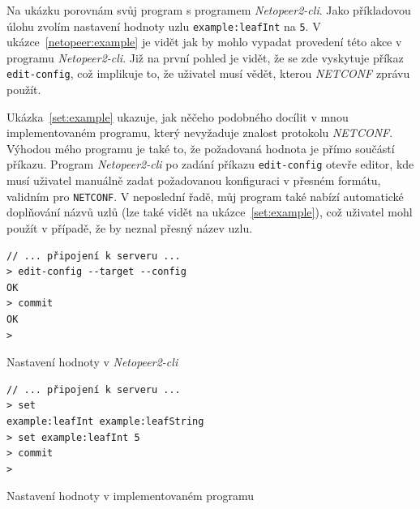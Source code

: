 \documentclass[thesis=B,czech,hidelinks]{FITthesis}[2019/03/06]
\begin{document}
Na ukázku porovnám svůj program s programem \textit{Netopeer2-cli}. Jako příkladovou úlohu zvolím nastavení hodnoty uzlu \texttt{example:leafInt} na \texttt{5}. V ukázce~\ref{netopeer:example} je vidět jak by mohlo vypadat provedení této akce v programu \textit{Netopeer2-cli}. Již na první pohled je vidět, že se zde vyskytuje příkaz \texttt{edit-config}, což implikuje to, že uživatel musí vědět, kterou \textit{NETCONF} zprávu použít.

Ukázka~\ref{set:example} ukazuje, jak něčeho podobného docílit v mnou implementovaném programu, který nevyžaduje znalost protokolu \textit{NETCONF}. Výhodou mého programu je také to, že požadovaná hodnota je přímo součástí příkazu. Program \textit{Netopeer2-cli} po zadání příkazu \texttt{edit-config} otevře editor, kde musí uživatel manuálně zadat požadovanou konfiguraci v přesném formátu, validním pro \texttt{NETCONF}. V neposlední řadě, můj program také nabízí automatické doplňování názvů uzlů (lze také vidět na ukázce~\ref{set:example}), což uživatel mohl použít v případě, že by neznal přesný název uzlu.
\begin{listing}
\begin{verbatim}
// ... připojení k serveru ...
> edit-config --target --config
OK
> commit
OK
>
\end{verbatim}
\caption{Nastavení hodnoty v \textit{Netopeer2-cli}\label{netopeer:example}}
\end{listing}

\begin{listing}
\begin{verbatim}
// ... připojení k serveru ...
> set
example:leafInt example:leafString
> set example:leafInt 5
> commit
>
\end{verbatim}
\caption{Nastavení hodnoty v implementovaném programu}\label{set:example}
\end{listing}
\end{document}
